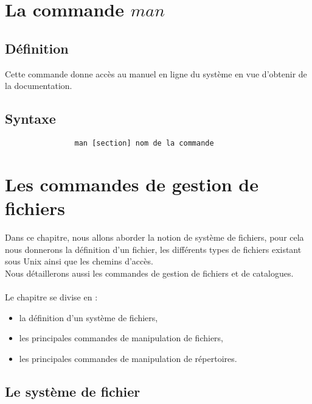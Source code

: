 	\chapter{La commande $man$}
		\section{Définition}
			Cette commande donne accès au manuel en ligne du système en vue d'obtenir de la documentation.
		\section{Syntaxe}
			\begin{verbatim}	
				man [section] nom de la commande
			\end{verbatim}
	\chapter{Les commandes de gestion de fichiers}
		Dans ce chapitre, nous allons aborder la notion de système de fichiers, pour cela nous donnerons la définition d'un fichier, les différents types de fichiers existant sous Unix ainsi que les chemins d'accès.\\
		Nous détaillerons aussi les commandes de gestion de fichiers et de catalogues.\\ \\
		Le chapitre se divise en :\\
		\begin{itemize}
			\item la définition d'un système de fichiers, 
			\item les principales commandes de manipulation de fichiers, 
			\item les principales commandes de manipulation de répertoires. 
		\end{itemize}
		\section{Le système de fichier}
